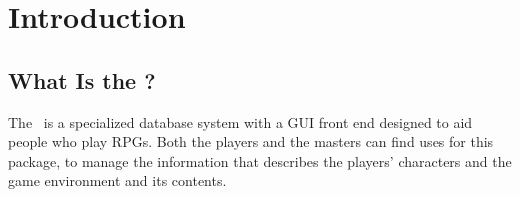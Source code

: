 
\chapter{Introduction}
\label{Intro}
\section{What Is the \thesystem?}

The \thesystem\ is a specialized database system with a GUI front end
designed to aid people who play RPGs.  Both the players and the masters
can find uses for this package, to manage the information that
describes the players' characters and the game environment and its
contents.

